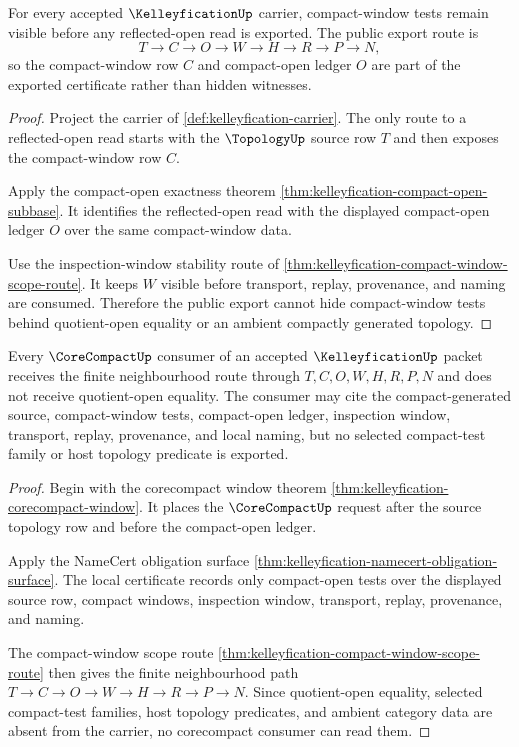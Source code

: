 \begin{theorem}
\label{thm:kelleyfication-compact-window-public-export}
For every accepted $\KelleyficationUp$ carrier, compact-window tests remain visible before any reflected-open read is exported. The public export route is
$$
T \to C \to O \to W \to H \to R \to P \to N,
$$
so the compact-window row $C$ and compact-open ledger $O$ are part of the exported certificate rather than hidden witnesses.
\end{theorem}
\begin{proof}
Project the carrier of \autoref{def:kelleyfication-carrier}. The only route to a reflected-open read starts with the $\TopologyUp$ source row $T$ and then exposes the compact-window row $C$.

Apply the compact-open exactness theorem \autoref{thm:kelleyfication-compact-open-subbase}. It identifies the reflected-open read with the displayed compact-open ledger $O$ over the same compact-window data.

Use the inspection-window stability route of \autoref{thm:kelleyfication-compact-window-scope-route}. It keeps $W$ visible before transport, replay, provenance, and naming are consumed. Therefore the public export cannot hide compact-window tests behind quotient-open equality or an ambient compactly generated topology.
\end{proof}

\begin{theorem}
\label{thm:kelleyfication-corecompact-consumer-boundary}
Every $\CoreCompactUp$ consumer of an accepted $\KelleyficationUp$ packet receives the finite neighbourhood route through $T,C,O,W,H,R,P,N$ and does not receive quotient-open equality. The consumer may cite the compact-generated source, compact-window tests, compact-open ledger, inspection window, transport, replay, provenance, and local naming, but no selected compact-test family or host topology predicate is exported.
\end{theorem}
\begin{proof}
Begin with the corecompact window theorem \autoref{thm:kelleyfication-corecompact-window}. It places the $\CoreCompactUp$ request after the source topology row and before the compact-open ledger.

Apply the NameCert obligation surface \autoref{thm:kelleyfication-namecert-obligation-surface}. The local certificate records only compact-open tests over the displayed source row, compact windows, inspection window, transport, replay, provenance, and naming.

The compact-window scope route \autoref{thm:kelleyfication-compact-window-scope-route} then gives the finite neighbourhood path $T \to C \to O \to W \to H \to R \to P \to N$. Since quotient-open equality, selected compact-test families, host topology predicates, and ambient category data are absent from the carrier, no corecompact consumer can read them.
\end{proof}

